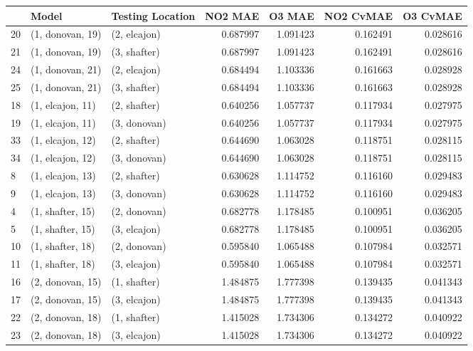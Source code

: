\begin{tabular}{lllrrrr}
\toprule
{} &             Model & Testing Location &   NO2 MAE &    O3 MAE &  NO2 CvMAE &  O3 CvMAE \\
\midrule
20 &  (1, donovan, 19) &     (2, elcajon) &  0.687997 &  1.091423 &   0.162491 &  0.028616 \\
21 &  (1, donovan, 19) &     (3, shafter) &  0.687997 &  1.091423 &   0.162491 &  0.028616 \\
24 &  (1, donovan, 21) &     (2, elcajon) &  0.684494 &  1.103336 &   0.161663 &  0.028928 \\
25 &  (1, donovan, 21) &     (3, shafter) &  0.684494 &  1.103336 &   0.161663 &  0.028928 \\
18 &  (1, elcajon, 11) &     (2, shafter) &  0.640256 &  1.057737 &   0.117934 &  0.027975 \\
19 &  (1, elcajon, 11) &     (3, donovan) &  0.640256 &  1.057737 &   0.117934 &  0.027975 \\
33 &  (1, elcajon, 12) &     (2, shafter) &  0.644690 &  1.063028 &   0.118751 &  0.028115 \\
34 &  (1, elcajon, 12) &     (3, donovan) &  0.644690 &  1.063028 &   0.118751 &  0.028115 \\
8  &  (1, elcajon, 13) &     (2, shafter) &  0.630628 &  1.114752 &   0.116160 &  0.029483 \\
9  &  (1, elcajon, 13) &     (3, donovan) &  0.630628 &  1.114752 &   0.116160 &  0.029483 \\
4  &  (1, shafter, 15) &     (2, donovan) &  0.682778 &  1.178485 &   0.100951 &  0.036205 \\
5  &  (1, shafter, 15) &     (3, elcajon) &  0.682778 &  1.178485 &   0.100951 &  0.036205 \\
10 &  (1, shafter, 18) &     (2, donovan) &  0.595840 &  1.065488 &   0.107984 &  0.032571 \\
11 &  (1, shafter, 18) &     (3, elcajon) &  0.595840 &  1.065488 &   0.107984 &  0.032571 \\
16 &  (2, donovan, 15) &     (1, shafter) &  1.484875 &  1.777398 &   0.139435 &  0.041343 \\
17 &  (2, donovan, 15) &     (3, elcajon) &  1.484875 &  1.777398 &   0.139435 &  0.041343 \\
22 &  (2, donovan, 18) &     (1, shafter) &  1.415028 &  1.734306 &   0.134272 &  0.040922 \\
23 &  (2, donovan, 18) &     (3, elcajon) &  1.415028 &  1.734306 &   0.134272 &  0.040922 \\

\end{tabular}

